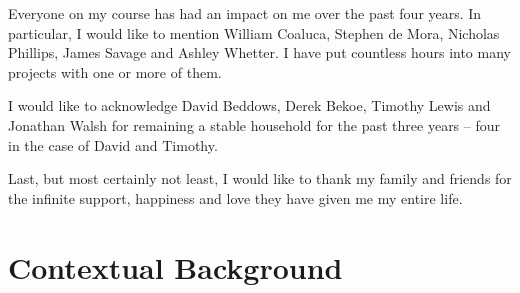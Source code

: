 \documentclass[ %
                    author={Dominic Joseph Moylett},
                    degree={MEng},
                     title={Dictionary Matching with Fingerprints},
                  subtitle={An Empirical Analysis},
                      type={research},
                      year={2015} ]{dissertation}
\begin{document}
Everyone on my course has had an impact on me over the past four years. In particular, I would like to mention William Coaluca, Stephen de Mora, Nicholas Phillips, James Savage and Ashley Whetter. I have put countless hours into many projects with one or more of them.

I would like to acknowledge David Beddows, Derek Bekoe, Timothy Lewis and Jonathan Walsh for remaining a stable household for the past three years -- four in the case of David and Timothy.

Last, but most certainly not least, I would like to thank my family and friends for the infinite support, happiness and love they have given me my entire life.


\tableofcontents
\listoffigures
\listoftables
\listofalgorithms



%

\mainmatter


\chapter{Contextual Background}
\label{chap:context}
\end{document}
